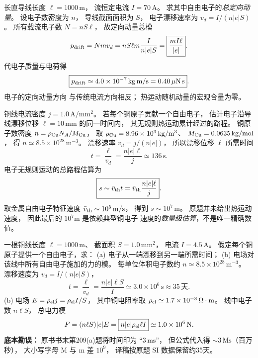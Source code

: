 长直导线长度 $\ell=1000\,\mathrm m$，
流恒定电流 $I=70\,\mathrm A$。
求其中自由电子的\emph{总定向动量}。
\exsolution
设电子数密度为 $n$，
导线截面面积为 $S$，
电子漂移速率为
$v_d=I/(n|e|S)$。
所有载流电子数
$N=nS\ell$，
故定向动量总模
\[
p_{\rm drift}=Nmv_d
=nS\ell m\frac{I}{n|e|S}
=\boxed{\frac{mI\ell}{|e|}}.
\]
代电子质量与电荷得
\[
\boxed{p_{\rm drift}\simeq4.0\times10^{-7}\,
\mathrm{kg\,m/s}=0.40\,\mathrm{\mu N\,s}}.
\]
\excheck 电子的定向动量方向
与传统电流方向相反；
热运动随机动量的宏观合量为零。

铜线电流密度
$j=1.0\,\mathrm{A/mm^2}$。
若每个铜原子贡献一个自由电子，
估计电子沿导线漂移位移
$\ell=10\,\mathrm{mm}$ 的同一时间内，
其无规则热运动累计经过的路程。
\exsolution
铜原子数密度
$n=\rho_{\rm Cu}N_A/M_{\rm Cu}$，
取 $\rho_{\rm Cu}=8.96\times10^3
\,\mathrm{kg/m^3}$、
$M_{\rm Cu}=0.0635\,\mathrm{kg/mol}$，
得 $n\simeq8.5\times10^{28}\,\mathrm{m^{-3}}$。
漂移速率
$v_d=j/(n|e|)$，
所以漂移位移 $\ell$ 所需时间
\[
t=\frac{\ell}{v_d}=\frac{n|e|\ell}{j}
\simeq136\,\mathrm s.
\]
电子无规则运动的总路程估算为
\[
\boxed{s\sim\bar v_{\rm th}t
=\bar v_{\rm th}\frac{n|e|\ell}{j}}.
\]
取金属自由电子特征速度
$\bar v_{\rm th}\sim10^5\,\mathrm{m/s}$，
得到
$\boxed{s\sim10^7\,\mathrm m}$。
\excheck 原题并未给出热运动速度，
因此最后的 $10^7$m 是依赖典型铜电子
速度的\emph{数量级估算}，不是唯一精确数值。

一根铜线长度 $\ell=1000\,\mathrm m$、
截面积 $S=1.0\,\mathrm{mm^2}$，
电流 $I=4.5\,\mathrm A$。
假定每个铜原子提供一个自由电子，求：
(a) 电子从一端漂移到另一端所需时间；
(b) 电场对该线中所有自由电子施加的力的模。
\exsolution
每单位体积电子数约
$n\simeq8.5\times10^{28}\,\mathrm{m^{-3}}$。
漂移速度为 $v_d=I/(n|e|S)$，
\[
\boxed{t=\frac{\ell}{v_d}
=\frac{n|e|\ell S}{I}
\simeq3.0\times10^6\,\mathrm s
\approx35\,\text{天}}.
\]
(b) 电场
$E=\rho_{\rm el}j=\rho_{\rm el}I/S$，
其中铜电阻率取
$\rho_{\rm el}\simeq1.7\times10^{-8}\,
\Omega\cdot\mathrm m$。
线中电子数 $n\ell S$，
总电力模
\[
F=(n\ell S)|e|E
=\boxed{n|e|\rho_{\rm el}\ell I}
\simeq1.0\times10^6\,\mathrm N.
\]
\excheck \textbf{底本勘误：}
原书书末第209(a)题将时间印为
“$3\,\mathrm{ms}$”，
但公式代入得
$\sim3\,\mathrm{Ms}$（百万秒），
大小写字母 M 与 m 差 $10^9$，
译稿按原题 SI 数据保留约35天。

